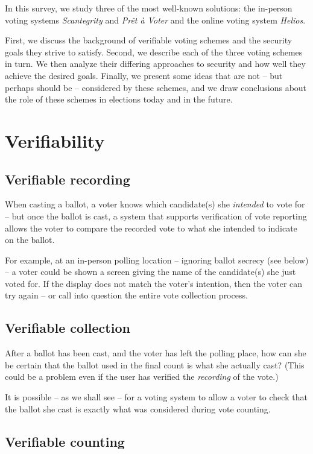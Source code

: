 \documentclass[10pt,twocolumn]{article}
\newcommand{\term}[1]{\textit{#1}}
\newcommand{\preta}{Pr\^{e}t \`{a}}
\newcommand{\pv}{\preta{} Voter}
\begin{document}
In this survey, we study three of the most well-known solutions: the in-person voting systems
\term{Scantegrity} and \term{\pv{}} and the online voting system \term{Helios}.

First, we discuss the background of verifiable voting schemes and the security goals they
strive to satisfy. Second, we describe each of the three voting schemes in turn. We then
analyze their differing approaches to security and how well they achieve the desired goals. Finally,
we present some ideas that are not -- but perhaps should be -- considered by these schemes, and
we draw conclusions about the role of these schemes in elections today and in the future.

\section{Verifiability}

\subsection{Verifiable recording}

When casting a ballot, a voter knows which candidate(s) she \emph{intended} to vote for -- but
once the ballot is cast, a system that supports verification of vote reporting allows the voter to
compare the recorded vote to what she intended to indicate on the ballot.

For example, at an in-person polling location -- ignoring ballot secrecy (see below) -- a voter
could be shown a screen giving the name of the candidate(s) she just voted for. If the display
does not match the voter's intention, then the voter can try again -- or call into question the
entire vote collection process.

\subsection{Verifiable collection}

After a ballot has been cast, and the voter has left the polling place, how can she be certain
that the ballot used in the final count is what she actually cast? (This could be a problem even
if the user has verified the \emph{recording} of the vote.)

It is possible -- as we shall see -- for a voting system to allow a voter to check that the ballot
she cast is exactly what was considered during vote counting.

\subsection{Verifiable counting}
\end{document}
